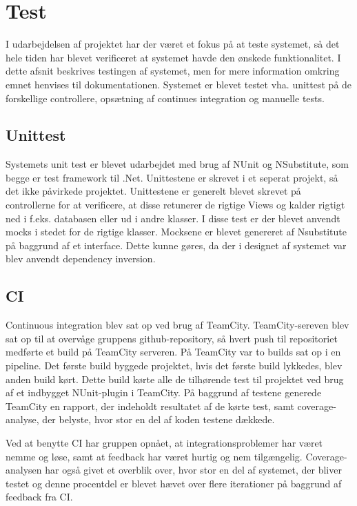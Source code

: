 \chapter{Test}
I udarbejdelsen af projektet har der været et fokus på at teste systemet, så det hele tiden har blevet verificeret at systemet havde den ønskede funktionalitet. I dette afsnit beskrives testingen af systemet, men for mere information omkring emnet henvises til dokumentationen.
Systemet er blevet testet vha. unittest på de forskellige controllere, opsætning af continues integration og manuelle tests.

\section{Unittest}
Systemets unit test er blevet udarbejdet med brug af NUnit og NSubstitute, som begge er test framework til .Net. Unittestene er skrevet i et seperat projekt, så det ikke påvirkede projektet.
Unittestene er generelt blevet skrevet på controllerne for at verificere, at disse retunerer de rigtige Views og kalder rigtigt ned i f.eks. databasen eller ud i andre klasser. I disse test er der blevet anvendt mocks i stedet for de rigtige klasser. Mocksene er blevet genereret af Nsubstitute på baggrund af et interface. Dette kunne gøres, da der i designet af systemet var blev anvendt dependency inversion.


\section{CI}
Continuous integration blev sat op ved brug af TeamCity. TeamCity-sereven blev sat op til at overvåge gruppens github-repository, så hvert push til repositoriet medførte et build på TeamCity serveren. På TeamCity var to builds sat op i en pipeline. Det første build byggede projektet, hvis det første build lykkedes, blev anden build kørt. Dette build kørte alle de tilhørende test til projektet ved brug af et indbygget NUnit-plugin i TeamCity. På baggrund af testene generede TeamCity en rapport, der indeholdt resultatet af de kørte test, samt coverage-analyse, der belyste, hvor stor en del af koden testene dækkede.

\noindent Ved at benytte CI har gruppen opnået, at integrationsproblemer har været nemme og løse, samt at feedback har været hurtig og nem tilgængelig. Coverage-analysen har også givet et overblik over, hvor stor en del af systemet, der bliver testet og denne procentdel er blevet hævet over flere iterationer på baggrund af feedback fra CI.